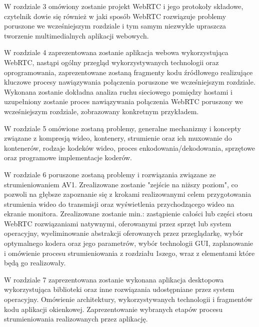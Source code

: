 W rozdziale 3 omówiony zostanie projekt WebRTC i jego protokoły składowe, czytelnik dowie się również w jaki sposób
WebRTC rozwiązuje problemy poruszone we wcześniejszym rozdziale i tym samym niezwykle upraszcza tworzenie
multimedialnych aplikacji webowych.

W rozdziale 4 zaprezentowana zostanie aplikacja webowa wykorzystująca WebRTC, nastąpi ogólny przegląd wykorzystywanych
technologii oraz oprogramowania, zaprezentowane zostaną fragmenty kodu źródłowego realizujące kluczowe procesy
nawiązywania połączenia poruszone we wcześniejszym rozdziale. Wykonana zostanie dokładna analiza ruchu sieciowego
pomiędzy hostami i uzupełniony zostanie proces nawiązywania połączenia WebRTC poruszony we wcześniejszym rozdziale,
zobrazowany konkretnym przykładem.

W rozdziale 5 omówione zostaną problemy, generalne mechanizmy i koncepty związane z kompresją wideo, kontenery,
strumienie oraz ich muxowanie do kontenerów, rodzaje kodeków wideo, proces enkodowania/dekodowania, sprzętowe oraz
programowe implementacje koderów.

W rozdziale 6 poruszone zostaną problemy i rozwiązania związane ze strumieniowaniem AV1. Zrealizowane zostanie "zejście
na niższy poziom", co pozwoli na głębsze zapoznanie się z krokami realizowanymi celem przygotowania strumienia wideo do
transmisji oraz wyświetlenia przychodzącego wideo na ekranie monitora. Zrealizowane zostanie min.: zastąpienie całości
lub części stosu WebRTC rozwiązaniami natywnymi, oferowanymi przez sprzęt lub system operacyjny, wyeliminowanie
abstrakcji oferowanych przez przeglądarkę, wybór optymalnego kodera oraz jego parametrów, wybór technologii GUI,
zaplanowanie i omówienie procesu strumieniowania z rozdziału 1szego, wraz z elementami które będą go realizowały.

W rozdziale 7 zaprezentowana zostanie wykonana aplikacja desktopowa wykorzystująca biblioteki oraz inne rozwiązania
udostępniane przez system operacyjny. Omówienie architektury, wykorzystywanych technologii i fragmentów kodu aplikacji
okienkowej. Zaprezentowanie wybranych etapów procesu strumieniowania realizowanych przez aplikację.
